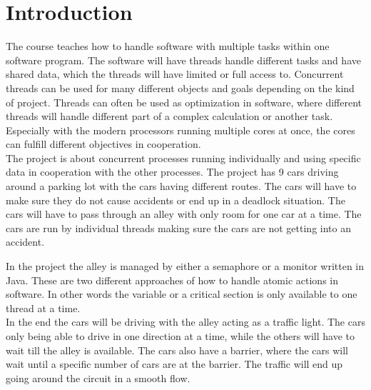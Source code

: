 \section{Introduction}
The course teaches how to handle software with multiple tasks within one software program. The software will have threads handle different tasks and have shared data, which the threads will have limited or full access to. Concurrent threads can be used for many different objects and goals depending on the kind of project. Threads can often be used as optimization in software, where different threads will handle different part of a complex calculation or another task. Especially with the modern processors running multiple cores at once, the cores can fulfill different objectives in cooperation.
\\

The project is about concurrent processes running individually and using specific data in cooperation with the other processes. The project has 9 cars driving around a parking lot with the cars having different routes. The cars will have to make sure they do not cause accidents or end up in a deadlock situation. The cars will have to pass through an alley with only room for one car at a time. The cars are run by individual threads making sure the cars are not getting into an accident. 

In the project the alley is managed by either a semaphore or a monitor written in Java. These are two different approaches of how to handle atomic actions in software. In other words the variable or a critical section is only available to one thread at a time.
\\

In the end the cars will be driving with the alley acting as a traffic light. The cars only being able to drive in one direction at a time, while the others will have to wait till the alley is available. The cars also have a barrier, where the cars will wait until a specific number of cars are at the barrier. The traffic will end up going around the circuit in a smooth flow.